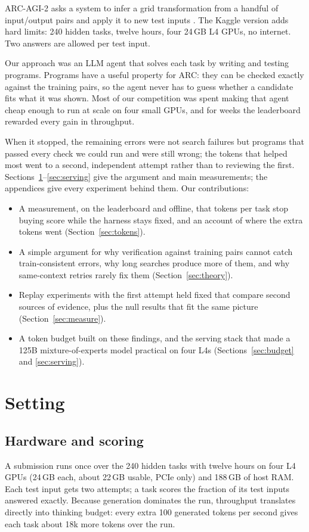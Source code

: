 \documentclass[11pt]{article}
\begin{document}
ARC-AGI-2 asks a system to infer a grid transformation from a handful of input/output pairs and apply it to new test inputs \cite{chollet2019,arcagi2}. The Kaggle version adds hard limits: 240 hidden tasks, twelve hours, four 24\,GB L4 GPUs, no internet. Two answers are allowed per test input.

Our approach was an LLM agent that solves each task by writing and testing programs. Programs have a useful property for ARC: they can be checked exactly against the training pairs, so the agent never has to guess whether a candidate fits what it was shown. Most of our competition was spent making that agent cheap enough to run at scale on four small GPUs, and for weeks the leaderboard rewarded every gain in throughput.

When it stopped, the remaining errors were not search failures but programs that passed every check we could run and were still wrong; the tokens that helped most went to a second, independent attempt rather than to reviewing the first. Sections~\ref{sec:setting}--\ref{sec:serving} give the argument and main measurements; the appendices give every experiment behind them. Our contributions:
\begin{itemize}
\item A measurement, on the leaderboard and offline, that tokens per task stop buying score while the harness stays fixed, and an account of where the extra tokens went (Section~\ref{sec:tokens}).
\item A simple argument for why verification against training pairs cannot catch train-consistent errors, why long searches produce more of them, and why same-context retries rarely fix them (Section~\ref{sec:theory}).
\item Replay experiments with the first attempt held fixed that compare second sources of evidence, plus the null results that fit the same picture (Section~\ref{sec:measure}).
\item A token budget built on these findings, and the serving stack that made a 125B mixture-of-experts model practical on four L4s (Sections~\ref{sec:budget} and \ref{sec:serving}).
\end{itemize}

\section{Setting}\label{sec:setting}

\subsection{Hardware and scoring}
A submission runs once over the 240 hidden tasks with twelve hours on four L4 GPUs (24\,GB each, about 22\,GB usable, PCIe only) and 188\,GB of host RAM. Each test input gets two attempts; a task scores the fraction of its test inputs answered exactly. Because generation dominates the run, throughput translates directly into thinking budget: every extra 100 generated tokens per second gives each task about 18k more tokens over the run.
\end{document}
